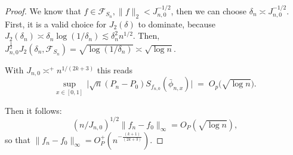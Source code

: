 \begin{proof}
We know that $f \in \mathcal F_{S_n}, \|f\|_2 < J_{n,0}^{-1/2}$, then we can choose $\delta_n \asymp J_{n,0}^{-1/2}$. First, it is a valid choice for $J_2(\delta)$ to dominate, because $J_2(\delta_n) \asymp \delta_n\log(1/\delta_n) \lesssim \delta_n^2 n^{1/2}$. Then, $J_{n,0}^{\frac12} J_2(\delta_n, \mathcal F_{S_n}) = \sqrt{\log(1/\delta_n)} \asymp \sqrt{\log n}.$

With $J_{n,0} \asymp^+ n^{1/(2k+3)}$ this reads
\[
\sup_{x\in[0,1]}\, \big|\sqrt{n}(P_n-P_0)S_{f_{n,0}}(\bar\phi_{n,x})\big|
\;=\; O_p\!\Big(\sqrt{\log n}\Big).
\]

Then it follows:
 \[
(n/J_{n,0})^{1/2}\| f_n-f_0\|_{\infty}=O_P(\sqrt{\log n}),
\]
so that $ \| f_n-f_0\|_{\infty}=O_P^+(n^{-\frac{(k+1)}{(2k+3)}})$.

\end{proof}

